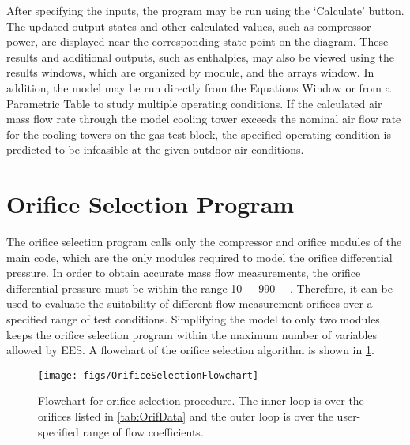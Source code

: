 After specifying the inputs, the program may be run using the `Calculate' button. 
The updated output states and other calculated values, such as compressor power,
are displayed near the corresponding state point on the diagram. 
These results and additional outputs, such as enthalpies, 
may also be viewed using the results windows, which are organized by module,
and the arrays window.
In addition, the model may be run directly from the Equations Window or
from a Parametric Table to study multiple operating conditions.
If the calculated air mass flow rate through the model cooling tower exceeds
the nominal air flow rate for the cooling towers on the gas test block,
the specified operating condition is predicted to be infeasible at the given
outdoor air conditions.

\section{Orifice Selection Program} \label{sec:OrifSelect}
The orifice selection program calls only the 
compressor and orifice modules of the main code,
which are the only modules required to model the orifice differential pressure.
In order to obtain accurate mass flow measurements, the orifice differential pressure
must be within the range \SIrange{10}{990}{\inch{}} \parencite{trevino2012}.
Therefore, it can be used to evaluate the suitability of 
different flow measurement orifices over a specified range of test conditions.
Simplifying the model to only two modules keeps the orifice selection program within the maximum
number of variables allowed by EES.
A flowchart of the orifice selection algorithm is shown in \cref{fig:FlowOrifSelect}.
\begin{figure}[htbp]
  \centering
  \texttt{[image: figs/OrificeSelectionFlowchart]}
  \caption{Flowchart for orifice selection procedure. 
    The inner loop is over the orifices listed in \cref{tab:OrifData}
    and the outer loop is over the user-specified range of flow coefficients.}
  \label{fig:FlowOrifSelect}
\end{figure}

